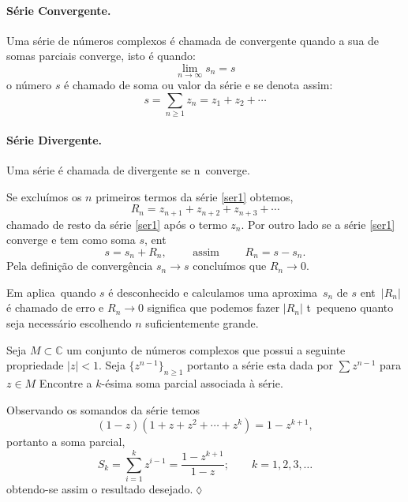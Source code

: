 \paragraph{S\'erie Convergente.} Uma s\'erie de n\'umeros complexos
\'e chamada de convergente quando a sua \seq de somas parciais
converge, isto \'e quando:
\begin{equation*}
  \lim_{n\to\infty}s_n=s
\end{equation*}
o n\'umero $s$ \'e chamado de soma ou valor da s\'erie e se denota
assim:
\begin{equation*}
  s=\sum_{n\geq 1}z_n=z_1+z_2+\cdots
\end{equation*}

\paragraph{S\'erie Divergente.} Uma s\'erie \'e chamada de divergente
se n\ao\ converge.

Se excluímos os $n$ primeiros termos da s\'{e}rie \eqref{ser1}
obtemos,
\begin{equation}\label{ser2}
  R_n=z_{n+1}+z_{n+2}+z_{n+3}+\cdots
\end{equation}
chamado de resto da s\'erie \eqref{ser1} ap\'os o termo $z_n$.
Por outro lado se a s\'erie \eqref{ser1} converge e tem como soma $s$,
ent\ao
\begin{equation*}
s=s_n+R_n,\qquad \text{ assim }\qquad R_n=s-s_n.
\end{equation*}
Pela definição de convergência $s_n\to s$ concluímos que $R_{n}\to 0$.
\begin{obs}

Em aplica\coes\ quando $s$ \'e desconhecido e calculamos uma
aproxima\cao\ $s_n$ de $s$ ent\ao\ $|R_n|$ \'e chamado de erro e
$R_n\to 0$ significa que podemos fazer $|R_n|$ t\ao\ pequeno
quanto seja necess\'ario escolhendo $n$ suficientemente grande.
\end{obs}

\begin{exer}
Seja $M\subset \mathbb{C}$ um conjunto de n\'{u}meros complexos que
possui a seguinte propriedade $|z|<1$. Seja  $\{z^{n-1}\}_{n\geq
1}$ portanto a s\'{e}rie esta dada por $\sum z^{n-1}$ para $z\in M$
Encontre a $k$-\'{e}sima soma parcial associada \`{a} s\'{e}rie.
\end{exer}

\solo Observando os somandos da s\'{e}rie temos
\begin{equation*}
    (1-z)(1+z+z^2+\cdots+z^k)=1-z^{k+1},
\end{equation*}
portanto a soma parcial,
\begin{equation*}
  S_k=\sum_{i=1}^kz^{i-1}=\frac{1-z^{k+1}}{1-z};\qquad k=1, 2, 3,\ldots
\end{equation*}
obtendo-se assim o resultado desejado.\hfill \(\lozenge\)


